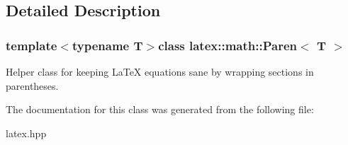 \subsection{\-Detailed \-Description}
\subsubsection*{template$<$typename T$>$class latex\-::math\-::\-Paren$<$ T $>$}

\-Helper class for keeping \-La\-Te\-X equations sane by wrapping sections in parentheses. 

\-The documentation for this class was generated from the following file\-:\begin{DoxyCompactItemize}
\item 
latex.\-hpp\end{DoxyCompactItemize}
